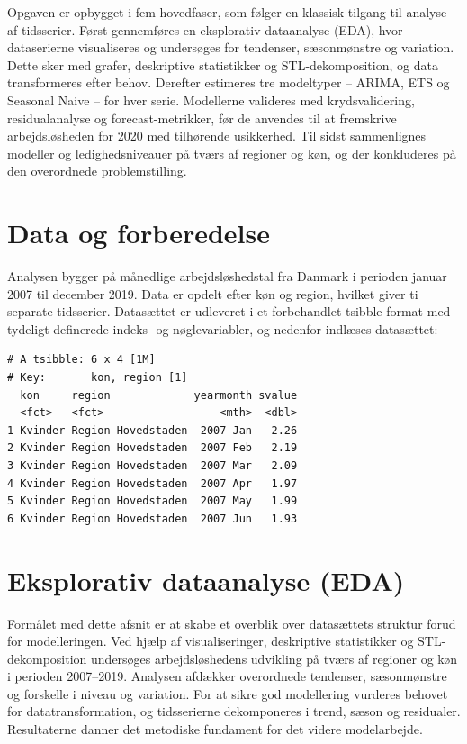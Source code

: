 \documentclass[
]{article}
\begin{document}
Opgaven er opbygget i fem hovedfaser, som følger en klassisk tilgang til
analyse af tidsserier. Først gennemføres en eksplorativ dataanalyse
(EDA), hvor dataserierne visualiseres og undersøges for tendenser,
sæsonmønstre og variation. Dette sker med grafer, deskriptive
statistikker og STL-dekomposition, og data transformeres efter behov.
Derefter estimeres tre modeltyper -- ARIMA, ETS og Seasonal Naive -- for
hver serie. Modellerne valideres med krydsvalidering, residualanalyse og
forecast-metrikker, før de anvendes til at fremskrive arbejdsløsheden
for 2020 med tilhørende usikkerhed. Til sidst sammenlignes modeller og
ledighedsniveauer på tværs af regioner og køn, og der konkluderes på den
overordnede problemstilling.

\section{Data og forberedelse}\label{data-og-forberedelse}

Analysen bygger på månedlige arbejdsløshedstal fra Danmark i perioden
januar 2007 til december 2019. Data er opdelt efter køn og region,
hvilket giver ti separate tidsserier. Datasættet er udleveret i et
forbehandlet tsibble-format med tydeligt definerede indeks- og
nøglevariabler, og nedenfor indlæses datasættet:

\begin{verbatim}
# A tsibble: 6 x 4 [1M]
# Key:       kon, region [1]
  kon     region             yearmonth svalue
  <fct>   <fct>                  <mth>  <dbl>
1 Kvinder Region Hovedstaden  2007 Jan   2.26
2 Kvinder Region Hovedstaden  2007 Feb   2.19
3 Kvinder Region Hovedstaden  2007 Mar   2.09
4 Kvinder Region Hovedstaden  2007 Apr   1.97
5 Kvinder Region Hovedstaden  2007 May   1.99
6 Kvinder Region Hovedstaden  2007 Jun   1.93
\end{verbatim}

\section{Eksplorativ dataanalyse
(EDA)}\label{eksplorativ-dataanalyse-eda}

Formålet med dette afsnit er at skabe et overblik over datasættets
struktur forud for modelleringen. Ved hjælp af visualiseringer,
deskriptive statistikker og STL-dekomposition undersøges
arbejdsløshedens udvikling på tværs af regioner og køn i perioden
2007--2019. Analysen afdækker overordnede tendenser, sæsonmønstre og
forskelle i niveau og variation. For at sikre god modellering vurderes
behovet for datatransformation, og tidsserierne dekomponeres i trend,
sæson og residualer. Resultaterne danner det metodiske fundament for det
videre modelarbejde.
\end{document}
